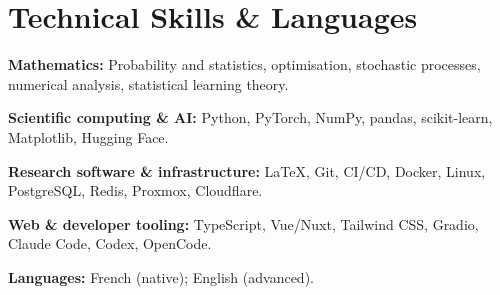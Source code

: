 \section{Technical Skills \& Languages}
\textbf{Mathematics:} Probability and statistics, optimisation, stochastic
processes, numerical analysis, statistical learning theory.\par
\textbf{Scientific computing \& AI:} Python, PyTorch, NumPy, pandas,
scikit-learn, Matplotlib, Hugging Face.\par
\textbf{Research software \& infrastructure:} \LaTeX, Git, CI/CD, Docker,
Linux, PostgreSQL, Redis, Proxmox, Cloudflare.\par
\textbf{Web \& developer tooling:} TypeScript, Vue/Nuxt, Tailwind CSS,
Gradio, Claude Code, Codex, OpenCode.\par
\textbf{Languages:} French (native); English (advanced).
